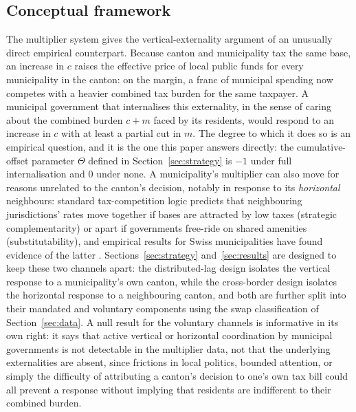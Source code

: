 \documentclass[11pt,a4paper]{article}
\begin{document}
\subsection{Conceptual framework}\label{sec:concept}
The multiplier system gives the vertical-externality argument of \citet{KeenKotsogiannis2002} an unusually direct empirical counterpart. Because canton and municipality tax the same base, an increase in $c$ raises the effective price of local public funds for every municipality in the canton: on the margin, a franc of municipal spending now competes with a heavier combined tax burden for the same taxpayer. A municipal government that internalises this externality, in the sense of caring about the combined burden $c+m$ faced by its residents, would respond to an increase in $c$ with at least a partial cut in $m$. The degree to which it does so is an empirical question, and it is the one this paper answers directly: the cumulative-offset parameter $\Theta$ defined in Section~\ref{sec:strategy} is $-1$ under full internalisation and $0$ under none. A municipality's multiplier can also move for reasons unrelated to the canton's decision, notably in response to its \emph{horizontal} neighbours: standard tax-competition logic predicts that neighbouring jurisdictions' rates move together if bases are attracted by low taxes (strategic complementarity) or apart if governments free-ride on shared amenities (substitutability), and empirical results for Swiss municipalities have found evidence of the latter \citep{Parchet2019}. Sections~\ref{sec:strategy} and~\ref{sec:results} are designed to keep these two channels apart: the distributed-lag design isolates the vertical response to a municipality's own canton, while the cross-border design isolates the horizontal response to a neighbouring canton, and both are further split into their mandated and voluntary components using the swap classification of Section~\ref{sec:data}. A null result for the voluntary channels is informative in its own right: it says that active vertical or horizontal coordination by municipal governments is not detectable in the multiplier data, not that the underlying externalities are absent, since frictions in local politics, bounded attention, or simply the difficulty of attributing a canton's decision to one's own tax bill could all prevent a response without implying that residents are indifferent to their combined burden.
\end{document}

